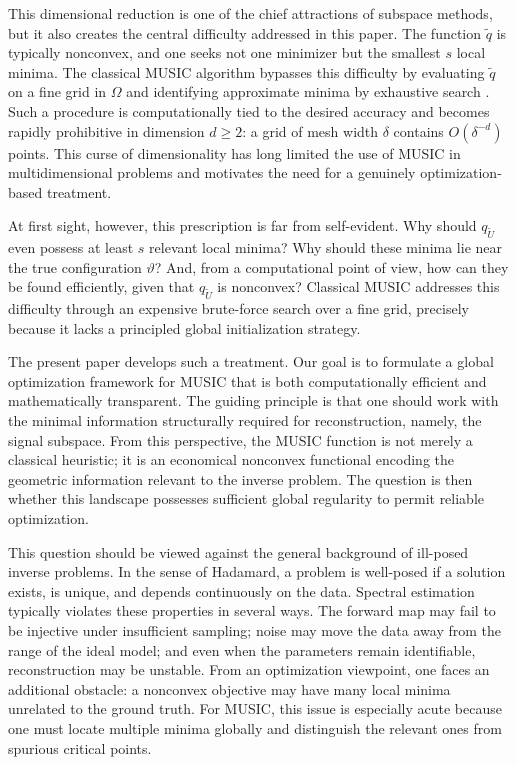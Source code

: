\documentclass[11pt]{article}
\theoremstyle{definition}
\numberwithin{theorem}{section}
\numberwithin{lemma}{section}
\numberwithin{equation}{section}
\renewcommand{\tilde}{\widetilde}
\newcommand{\domain}{\Omega}
\numberwithin{equation}{section}
\begin{document}
This dimensional reduction is one of the chief attractions of subspace methods, but it also creates the central difficulty addressed in this paper. The function $\tilde q$ is typically nonconvex, and one seeks not one minimizer but the smallest $s$ local minima. The classical MUSIC algorithm bypasses this difficulty by evaluating $\tilde q$ on a fine grid in $\domain$ and identifying approximate minima by exhaustive search \cite{schmidt1986multiple,stoica1989music,liao2016music}. Such a procedure is computationally tied to the desired accuracy and becomes rapidly prohibitive in dimension $d\ge 2$: a grid of mesh width $\delta$ contains $O(\delta^{-d})$ points. This curse of dimensionality has long limited the use of MUSIC in multidimensional problems and motivates the need for a genuinely optimization-based treatment.

At first sight, however, this prescription is far from self-evident. Why should $q_{\tilde U}$ even possess at least $s$ relevant local minima? Why should these minima lie near the true configuration $\vartheta$? And, from a computational point of view, how can they be found efficiently, given that $q_{\tilde U}$ is nonconvex? Classical MUSIC addresses this difficulty through an expensive brute-force search over a fine grid, precisely because it lacks a principled global initialization strategy.


The present paper develops such a treatment. Our goal is to formulate a global optimization framework for MUSIC that is both computationally efficient and mathematically transparent. The guiding principle is that one should work with the minimal information structurally required for reconstruction, namely, the signal subspace. From this perspective, the MUSIC function is not merely a classical heuristic; it is an economical nonconvex functional encoding the geometric information relevant to the inverse problem. The question is then whether this landscape possesses sufficient global regularity to permit reliable optimization.

This question should be viewed against the general background of ill-posed inverse problems. In the sense of Hadamard, a problem is well-posed if a solution exists, is unique, and depends continuously on the data. Spectral estimation typically violates these properties in several ways. The forward map may fail to be injective under insufficient sampling; noise may move the data away from the range of the ideal model; and even when the parameters remain identifiable, reconstruction may be unstable. From an optimization viewpoint, one faces an additional obstacle: a nonconvex objective may have many local minima unrelated to the ground truth. For MUSIC, this issue is especially acute because one must locate multiple minima globally and distinguish the relevant ones from spurious critical points.
\end{document}
